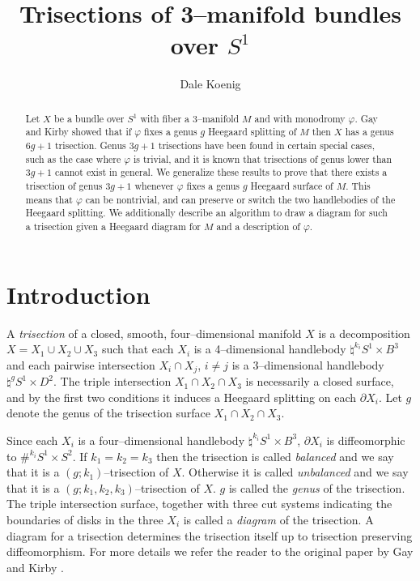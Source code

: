 \documentclass[12pt]{amsart}
\newcommand{\del}{\partial }
\theoremstyle{definition}
\theoremstyle{remark}
\begin{document}
\title{Trisections of 3--manifold bundles over $S^1$}
\author{Dale Koenig}
\date{}


\begin{abstract}
Let $X$ be a bundle over $S^1$ with fiber a 3--manifold $M$ and with monodromy $\varphi$.
Gay and Kirby showed that if $\varphi$ fixes a genus $g$ Heegaard splitting of $M$ then $X$ has a genus $6g+1$ trisection.
Genus $3g+1$ trisections have been found in certain special cases, such as the case where $\varphi$ is trivial, and it is known that trisections of genus lower than $3g+1$ cannot exist in general.
We generalize these results to prove that there exists a trisection of genus $3g+1$ whenever $\varphi$ fixes a genus $g$ Heegaard surface of $M$.
This means that $\varphi$ can be nontrivial, and can preserve or switch the two handlebodies of the Heegaard splitting.
We additionally describe an algorithm to draw a diagram for such a trisection given a Heegaard diagram for $M$ and a description of $\varphi$.
\end{abstract}

\maketitle

\section{Introduction}
A \emph{trisection} of a closed, smooth, four--dimensional manifold $X$ is a decomposition $X = X_1 \cup X_2 \cup X_3$ such that each $X_i$ is a 4--dimensional handlebody $\natural^{k_i} S^1 \times B^3$ and each pairwise intersection $X_i \cap X_j$, $i \not = j$ is a 3--dimensional handlebody $\natural^g S^1 \times D^2$.
The triple intersection $X_1 \cap X_2 \cap X_3$ is necessarily a closed surface, and by the first two conditions it induces a Heegaard splitting on each $\del X_i$.
Let $g$ denote the genus of the trisection surface $X_1 \cap X_2 \cap X_3$.


Since each $X_i$ is a four--dimensional handlebody $\natural^{k_i} S^1 \times B^3$, $\del X_i$ is diffeomorphic to $\#^{k_i} S^1 \times S^2$.
If $k_1 = k_2 = k_3$ then the trisection is called \emph{balanced} and we say that it is a $(g;k_1)$--trisection of $X$.
Otherwise it is called \emph{unbalanced} and we say that it is a $(g;k_1,k_2,k_3)$--trisection of $X$.
$g$ is called the \emph{genus} of the trisection.
The triple intersection surface, together with three cut systems indicating the boundaries of disks in the three $X_i$ is called a \emph{diagram} of the trisection.
A diagram for a trisection determines the trisection itself up to trisection preserving diffeomorphism.
For more details we refer the reader to the original paper by Gay and Kirby \cite{GayKirby1}.
\end{document}
